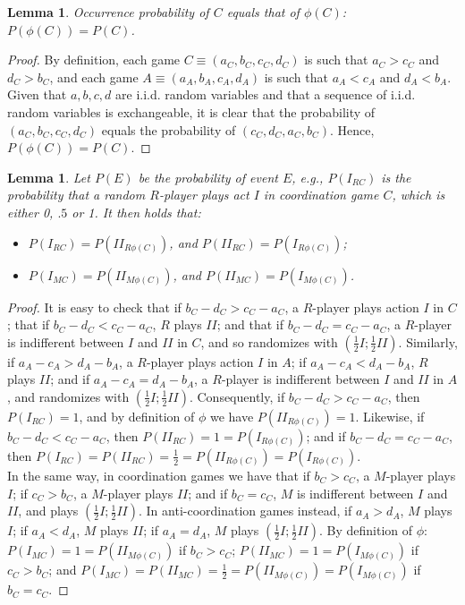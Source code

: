 \documentclass[fleqn,reqno,12pt]{article}
\theoremstyle{Satz}
\newtheorem{lemma}[theorem]{Lemma}
\theoremstyle{Bsp}
\begin{document}
\begin{lemma} \label{lemma:probabilities coord-ant}
Occurrence probability of $C$ equals that of $\phi(C)$: $P(\phi(C))=P(C)$.
\end{lemma}

\begin{proof}
  By definition, each game $C\equiv(a_{C},b_{C},c_{C},d_{C})$ is such that $a_{C}>c_{C}$ and
  $d_{C}>b_{C}$, and each game $A\equiv(a_{A},b_{A},c_{A},d_{A})$ is such that $a_{A}<c_{A}$
  and $d_{A}<b_{A}$. Given that $a,b,c,d$ are i.i.d. random variables and that a sequence of
  i.i.d. random variables is exchangeable, it is clear that the probability of
  $(a_{C},b_{C},c_{C},d_{C})$ equals the probability of $(c_{C},d_{C},a_{C},b_{C})$.  Hence,
  $P(\phi(C))=P(C)$.
\end{proof}

\begin{lemma} \label{lemma:probabilities actions coord-ant} Let $P(E)$ be the probability of
  event $E$, e.g., $P(I_{RC})$ is the probability that a random $R$-player plays act $I$ in coordination game $C$, which is either 0, $.5$ or 1.  It then holds that:
\begin{itemize}
\item $P(I_{RC})=P(II_{R\phi(C)})$, and $P(II_{RC})=P(I_{R\phi(C)})$;
\item $P(I_{MC})=P(II_{M\phi(C)})$, and $P(II_{MC})=P(I_{M\phi(C)})$.
\end{itemize}
\end{lemma}

\begin{proof}
  It is easy to check that if $b_{C}-d_{C}>c_{C}-a_{C}$, a $R$-player plays action $I$ in $C$;
  that if $b_{C}-d_{C}<c_{C}-a_{C}$, $R$ plays $II$; and that if $b_{C}-d_{C}=c_{C}-a_{C}$, a
  $R$-player is indifferent between $I$ and $II$ in $C$, and so randomizes with
  $(\frac{1}{2}I;\frac{1}{2}II)$. Similarly, if $a_{A}-c_{A}>d_{A}-b_{A}$, a $R$-player plays
  action $I$ in $A$; if $a_{A}-c_{A}<d_{A}-b_{A}$, $R$ plays $II$; and if
  $a_{A}-c_{A}=d_{A}-b_{A}$, a $R$-player is indifferent between $I$ and $II$ in $A$, and
  randomizes with $(\frac{1}{2}I;\frac{1}{2}II)$. Consequently, if $b_{C}-d_{C}>c_{C}-a_{C}$,
  then $P(I_{RC})=1$, and by definition of $\phi$ we have $P(II_{R\phi(C)})=1$. Likewise, if
  $b_{C}-d_{C}<c_{C}-a_{C}$, then $P(II_{RC})=1=P(I_{R\phi(C)})$; and if
  $b_{C}-d_{C}=c_{C}-a_{C}$,
  then $P(I_{RC})=P(II_{RC})=\frac{1}{2}=P(II_{R\phi(C)})=P(I_{R\phi(C)})$. \\
  In the same way, in coordination games we have that if $b_{C}>c_{C}$, a $M$-player plays $I$;
  if $c_{C}>b_{C}$, a $M$-player plays $II$; and if $b_{C}=c_{C}$, $M$ is indifferent between
  $I$ and $II$, and plays $(\frac{1}{2}I;\frac{1}{2}II)$. In anti-coordination games instead,
  if $a_{A}>d_{A}$, $M$ plays $I$; if $a_{A}<d_{A}$, $M$ plays $II$; if $a_{A}=d_{A}$, $M$
  plays $(\frac{1}{2}I;\frac{1}{2}II)$.  By definition of $\phi$:
  $P(I_{MC})=1=P(II_{M\phi(C)})$ if $b_{C}>c_{C}$; $P(II_{MC})=1=P(I_{M\phi(C)})$ if
  $c_{C}>b_{C}$; and $P(I_{MC})=P(II_{MC})=\frac{1}{2}=P(II_{M\phi(C)})=P(I_{M\phi(C)})$ if
  $b_{C}=c_{C}$.
\end{proof}
\end{document}
